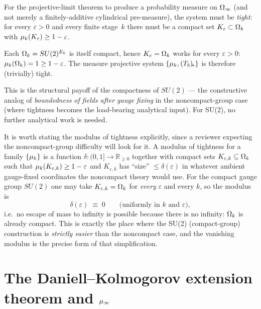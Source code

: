 For the projective-limit theorem to produce a probability measure on
$\Omega_\infty$ (and not merely a finitely-additive cylindrical pre-measure),
the system must be \emph{tight}: for every $\varepsilon > 0$ and every
finite stage~$k$ there must be a compact set $K_\varepsilon \subset
\Omega_k$ with $\mu_k(K_\varepsilon) \ge 1 - \varepsilon$.

\begin{proposition}
\label{prop:tightness}
Each $\Omega_k = SU(2)^{E_k}$ is itself compact, hence
$K_\varepsilon = \Omega_k$ works for every $\varepsilon > 0$:
$\mu_k(\Omega_k) = 1 \ge 1 - \varepsilon$.  The measure projective system
$\{\mu_k, (T_b)_{\!*}\}$ is therefore (trivially) tight.
\end{proposition}

This is the structural payoff of the compactness of $SU(2)$ — the
constructive analog of \emph{boundedness of fields after gauge fixing}
in the noncompact-group case (where tightness becomes the load-bearing
analytical input).  For SU(2), no further analytical work is needed.

\begin{remark}
\label{rem:tightness-modulus}
It is worth stating the modulus of tightness explicitly, since a
reviewer expecting the noncompact-group difficulty will look for it.
A modulus of tightness for a family $\{\mu_k\}$ is a function
$\delta \colon (0,1] \to \mathbb{R}_{\ge 0}$ together with compact sets
$K_{\varepsilon,k} \subseteq \Omega_k$ such that $\mu_k(K_{\varepsilon,k})
\ge 1 - \varepsilon$ and $K_{\varepsilon,k}$ has ``size'' $\le
\delta(\varepsilon)$ in whatever ambient gauge-fixed coordinates the
noncompact theory would use.  For the compact gauge group $SU(2)$ one
may take $K_{\varepsilon,k} = \Omega_k$ for \emph{every} $\varepsilon$ and
every $k$, so the modulus is
\begin{equation*}
  \delta(\varepsilon) \;\equiv\; 0 \qquad \text{(uniformly in } k
  \text{ and } \varepsilon),
\end{equation*}
i.e.\ no escape of mass to infinity is possible because there is no
infinity: $\Omega_k$ is already compact.  This is exactly the place where
the SU(2) (compact-group) construction is \emph{strictly easier} than
the noncompact case, and the vanishing modulus is the precise form of
that simplification.
\end{remark}

\section{The Daniell--Kolmogorov extension theorem and $\mu_\infty$}
\label{sec:extension}

